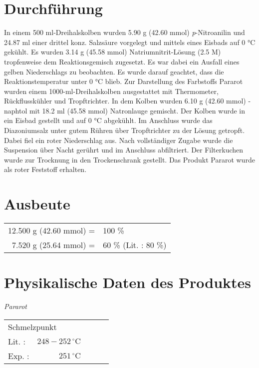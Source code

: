 \documentclass[12pt]{article}
\begin{document}
\begin{onehalfspace}

\section{Durchführung \cite{organikum}}
In einem 500 ml-Dreihalskolben wurden 5.90 g (42.60 mmol) \textit{p}-Nitroanilin und 24.87 ml einer drittel konz. Salzsäure vorgelegt und mittels eines Eisbads auf 0 \si{\celsius} gekühlt. Es wurden 3.14 g (45.58 mmol) Natriumnitrit-Lösung (2.5 M) tropfenweise dem Reaktionsgemisch zugesetzt. Es war dabei ein Ausfall eines gelben Niederschlags zu beobachten. Es wurde darauf geachtet, dass die Reaktionstemperatur unter 0 \si{\celsius} blieb. Zur Darstellung des Farbstoffs Pararot wurden einem 1000-ml-Dreihalskolben ausgestattet mit Thermometer, Rückflusskühler und Tropftrichter. In dem Kolben wurden 6.10 g (42.60 mmol) \chembeta-naphtol mit 18.2 ml (45.58 mmol) Natronlauge gemischt. Der Kolben wurde in ein Eisbad gestellt und auf 0 \si{\celsius} abgekühlt. Im Anschluss wurde das Diazoniumsalz unter gutem Rühren über Tropftrichter zu der Lösung getropft. Dabei fiel ein roter Niederschlag aus. Nach vollständiger Zugabe wurde die Suspension über Nacht gerührt und im Anschluss abfiltriert. Der Filterkuchen wurde zur Trocknung in den Trockenschrank gestellt. Das Produkt Pararot wurde als roter Feststoff erhalten.
\section{Ausbeute}
\begin{tabular}{ rl}
 12.500 g (42.60 mmol) =  & 100 \%\\
  7.520 g (25.64 mmol) =  & 60 \% (Lit.\cite{organikum} : 80 \%) \\
 \end{tabular}
\pagebreak
\section{Physikalische Daten des Produktes}
\textit{Pararot} \\[0.2cm]
\begin{tabular}{ lrclc }
 \multicolumn{2}{l}{Schmelzpunkt} & &   \\
   Lit. \cite{sigma} : & $ 248-252 \,^{\circ}\mathrm{C} $ & &  \\
   Exp. :& $ 251 \,^{\circ}\mathrm{C} $ & &  \\
 \end{tabular}

\end{onehalfspace}
\end{document}
